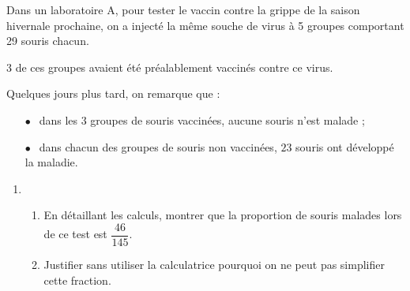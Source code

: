 \documentclass[10pt]{article}
\begin{document}
\setlength\parindent{0mm}
\pagestyle{fancy}
\thispagestyle{empty}
    
    
    




\medskip

Dans un laboratoire A, pour tester le vaccin contre la grippe de la saison hivernale prochaine, on a injecté la même souche de virus à 5 groupes comportant 29 souris chacun.

3 de ces groupes avaient été préalablement vaccinés contre ce virus.

Quelques jours plus tard, on remarque que :

\setlength\parindent{10mm}
\begin{itemize}
\item[$\bullet~~$] dans les $3$ groupes de souris vaccinées, aucune souris n'est malade ;
\item[$\bullet~~$] dans chacun des groupes de souris non vaccinées, $23$ souris ont développé la maladie.
\end{itemize}
\setlength\parindent{0mm} 

\medskip
 
\begin{enumerate}
\item 
	\begin{enumerate}
		\item En détaillant les calculs, montrer que la proportion de souris malades lors de ce test est $\dfrac{46}{145}$.
		\item Justifier sans utiliser la calculatrice pourquoi on ne peut pas simplifier cette fraction.
	\end{enumerate}	
\end{enumerate}
		
\end{document}
